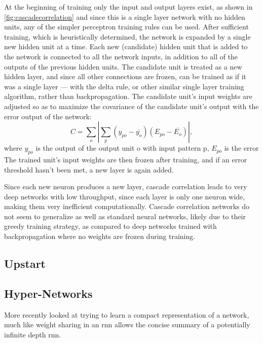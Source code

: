 \documentclass[thesis]{subfiles}
\begin{document}
	At the beginning of training only the input and output layers exist, as shown in \cref{fig:cascadecorrelation} and since this is a single layer network with no hidden units, any of the simpler perceptron training rules can be used. After sufficient training, which is heuristically determined, the network is expanded by a single new hidden unit at a time.
	Each new (candidate) hidden unit that is added to the network is connected to all the network inputs, in addition to all of the outputs of the previous hidden units. The candidate unit is treated as a new hidden layer, and since all other connections are frozen, can be trained as if it was a single layer --- \ie with the delta rule, or other similar single layer training algorithm, rather than backpropagation. The candidate unit's input weights are adjusted so as to maximize the covariance of the candidate unit's output with the error output of the network:
	\begin{equation}
	    C = \sum_o \left|\sum_p (y_{po} - \overline{y_o})(E_{po} - \overline{E_o})\right|,
	\end{equation}
	where $y_{po}$ is the output of the output unit o with input pattern p, $E_{po}$ is the error The trained unit's input weights are then frozen after training, and if an error threshold hasn't been met, a new layer is again added.
	
	Since each new neuron produces a new layer, cascade correlation leads to very deep networks with low throughput, since each layer is only one neuron wide, making them very inefficient computationally. Cascade correlation networks do not seem to generalize as well as standard neural networks, likely due to their greedy training strategy, as compared to deep networks trained with backpropagation where no weights are frozen during training.
	\subsection{Upstart}
	\subsection{Hyper-Networks}
	More recently \citet{hypernetworks} looked at trying to learn a compact representation of a network, much like weight sharing in an \gls{rnn} allows the concise summary of a potentially infinite depth \gls{rnn}\@.
\end{document}
